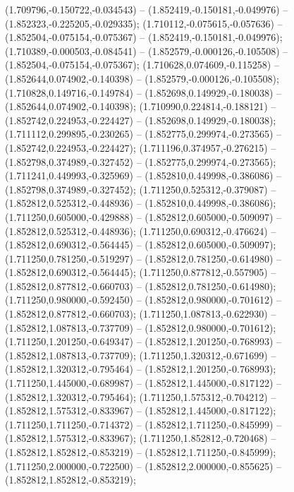  (1.709796,-0.150722,-0.034543) -- (1.852419,-0.150181,-0.049976) -- (1.852323,-0.225205,-0.029335);
 (1.710112,-0.075615,-0.057636) -- (1.852504,-0.075154,-0.075367) -- (1.852419,-0.150181,-0.049976);
 (1.710389,-0.000503,-0.084541) -- (1.852579,-0.000126,-0.105508) -- (1.852504,-0.075154,-0.075367);
 (1.710628,0.074609,-0.115258) -- (1.852644,0.074902,-0.140398) -- (1.852579,-0.000126,-0.105508);
 (1.710828,0.149716,-0.149784) -- (1.852698,0.149929,-0.180038) -- (1.852644,0.074902,-0.140398);
 (1.710990,0.224814,-0.188121) -- (1.852742,0.224953,-0.224427) -- (1.852698,0.149929,-0.180038);
 (1.711112,0.299895,-0.230265) -- (1.852775,0.299974,-0.273565) -- (1.852742,0.224953,-0.224427);
 (1.711196,0.374957,-0.276215) -- (1.852798,0.374989,-0.327452) -- (1.852775,0.299974,-0.273565);
 (1.711241,0.449993,-0.325969) -- (1.852810,0.449998,-0.386086) -- (1.852798,0.374989,-0.327452);
 (1.711250,0.525312,-0.379087) -- (1.852812,0.525312,-0.448936) -- (1.852810,0.449998,-0.386086);
 (1.711250,0.605000,-0.429888) -- (1.852812,0.605000,-0.509097) -- (1.852812,0.525312,-0.448936);
 (1.711250,0.690312,-0.476624) -- (1.852812,0.690312,-0.564445) -- (1.852812,0.605000,-0.509097);
 (1.711250,0.781250,-0.519297) -- (1.852812,0.781250,-0.614980) -- (1.852812,0.690312,-0.564445);
 (1.711250,0.877812,-0.557905) -- (1.852812,0.877812,-0.660703) -- (1.852812,0.781250,-0.614980);
 (1.711250,0.980000,-0.592450) -- (1.852812,0.980000,-0.701612) -- (1.852812,0.877812,-0.660703);
 (1.711250,1.087813,-0.622930) -- (1.852812,1.087813,-0.737709) -- (1.852812,0.980000,-0.701612);
 (1.711250,1.201250,-0.649347) -- (1.852812,1.201250,-0.768993) -- (1.852812,1.087813,-0.737709);
 (1.711250,1.320312,-0.671699) -- (1.852812,1.320312,-0.795464) -- (1.852812,1.201250,-0.768993);
 (1.711250,1.445000,-0.689987) -- (1.852812,1.445000,-0.817122) -- (1.852812,1.320312,-0.795464);
 (1.711250,1.575312,-0.704212) -- (1.852812,1.575312,-0.833967) -- (1.852812,1.445000,-0.817122);
 (1.711250,1.711250,-0.714372) -- (1.852812,1.711250,-0.845999) -- (1.852812,1.575312,-0.833967);
 (1.711250,1.852812,-0.720468) -- (1.852812,1.852812,-0.853219) -- (1.852812,1.711250,-0.845999);
 (1.711250,2.000000,-0.722500) -- (1.852812,2.000000,-0.855625) -- (1.852812,1.852812,-0.853219);
